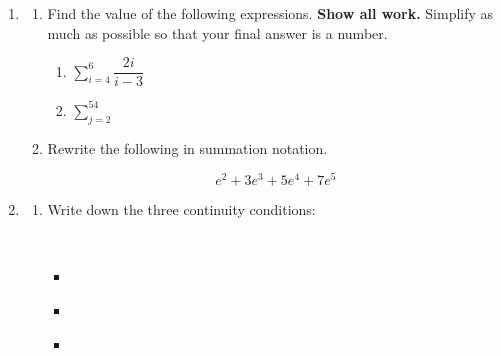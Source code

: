 \documentclass[11pt]{article}
\begin{document}
\begin{enumerate}
\newpage


\item \begin{enumerate}
    \item Find the value of the following expressions. \textbf{Show all work.} Simplify as much as possible so that your final answer is a number.

    \begin{enumerate}
        \item[(i)] $\displaystyle\sum_{i=4}^6\dfrac{2i}{i-3}$

        \vfill

        \item[(ii)] $\displaystyle\sum_{j=2}^54$ 

        \vfill
    \end{enumerate}

    \item Rewrite the following in summation notation. 

    \[e^2+3e^3+5e^4+7e^5\]

    \vfill
\end{enumerate}


\newpage


\item \begin{enumerate}
    
    \item Write down the three continuity conditions:
    
    \
    
        \begin{itemize}
        \item[i.] \hrulefill\\[0.1in]
        \item[ii.] \hrulefill\\[0.1in]
        \item[iii.] \hrulefill\\
        \end{itemize}


\end{enumerate}
\end{enumerate}
\end{document}
